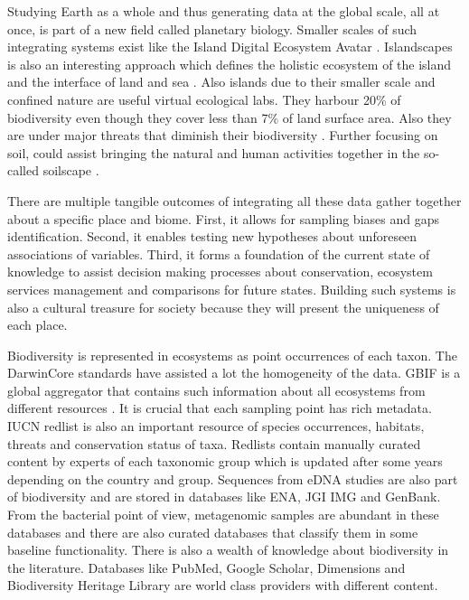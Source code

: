 Studying Earth as a whole and thus generating data at the global scale, all at once,
is part of a new field called planetary biology. Smaller scales of such integrating systems exist like
the Island Digital Ecosystem Avatar \parencite{Davies2016}. Islandscapes 
is also an interesting approach which defines the holistic ecosystem of the island
and the interface of land and sea \parencite{Vogiatzakis_land_2017}. Also islands
due to their smaller scale and confined nature are useful virtual ecological labs. They harbour 20\% of 
biodiversity even though they cover less than 7\% of land surface area. Also they are under major threats 
that diminish their biodiversity \parencite{fernandez-palacios2021scientists}.
Further focusing on soil, could assist bringing the natural and human activities 
together in the so-called soilscape \parencite{LAGACHERIE2001105}.

There are multiple tangible outcomes of integrating all these data gather together about a
specific place and biome. First, it allows for sampling biases and gaps identification. Second, 
it enables testing new hypotheses about unforeseen associations of variables. Third, 
it forms a foundation of the current state of knowledge to assist decision making 
processes about conservation, ecosystem services management and comparisons for 
future states. Building such systems is also a cultural treasure for society because
they will present the uniqueness of each place.

Biodiversity is represented in ecosystems as point occurrences of each taxon. The
DarwinCore standards have assisted a lot the homogeneity of the data. GBIF is a 
global aggregator that contains such information about all ecosystems from 
different resources \parencite{noauthor_gbif_nodate}. It is crucial that each sampling point has rich metadata. 
IUCN redlist \parencite{iucn2024} is also an important resource of species occurrences,
habitats, threats and conservation status of taxa. Redlists contain 
manually curated content by experts of each taxonomic group which is updated
after some years depending on the country and group.
Sequences from eDNA studies are also part of biodiversity and are stored in 
databases like ENA, JGI IMG and GenBank.
From the bacterial point of view, metagenomic samples are abundant in these 
databases and there are also curated databases that classify them in some baseline functionality. 
There is also a wealth of knowledge about biodiversity in the literature. 
Databases like PubMed, Google Scholar, Dimensions and Biodiversity Heritage Library 
are world class providers with different content.

